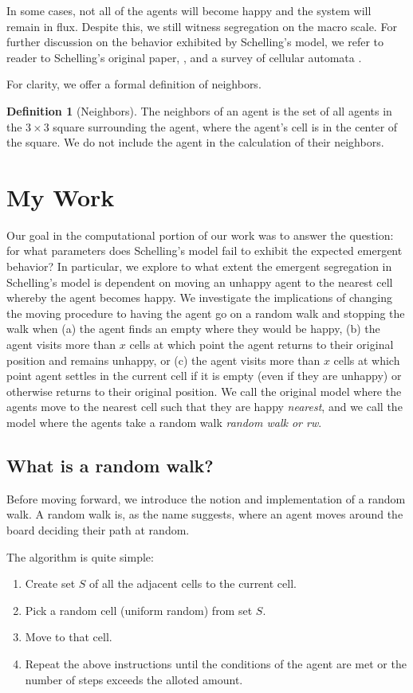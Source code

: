 \documentclass[11pt,twoside]{amsart}
\theoremstyle{theorem}
\theoremstyle{definition}
\newtheorem{definition}[theorem]{Definition}
\theoremstyle{remark}
\begin{document}
In some cases, not all of the agents will become happy and the system will remain in flux. 
Despite this, we still witness segregation on the macro scale. 
For further discussion on the behavior exhibited by Schelling's model, we refer to reader to Schelling's original paper, \cite{schelling}, and a survey of cellular automata \cite{thesis}.

For clarity, we offer a formal definition of neighbors.
\begin{definition}[Neighbors]
    The neighbors of an agent is the set of all agents in the $3 \times 3$ square surrounding the agent, where the agent's cell is in the center of the square. 
    We do not include the agent in the calculation of their neighbors. 
\end{definition}

\section{My Work}
Our goal in the computational portion of our work was to answer the question: for what parameters does Schelling's model fail to exhibit the expected emergent behavior?
In particular, we explore to what extent the emergent segregation in Schelling's model is dependent on moving an unhappy agent to the nearest cell whereby the agent becomes happy.
We investigate the implications of changing the moving procedure to having the agent go on a random walk and stopping the walk when (a) the agent finds an empty where they would be happy, (b) the agent visits more than $x$ cells at which point the agent returns to their original position and remains unhappy, or (c) the agent visits more than $x$ cells at which point agent settles in the current cell if it is empty (even if they are unhappy) or otherwise returns to their original position.
We call the original model where the agents move to the nearest cell such that they are happy \emph{nearest}, and we call the model where the agents take a random walk \emph{random walk or rw}.

\subsection{What is a random walk?}
Before moving forward, we introduce the notion and implementation of a random walk.
A random walk is, as the name suggests, where an agent moves around the board deciding their path at random. 

The algorithm is quite simple:
\begin{enumerate}
    \item Create set $S$ of all the adjacent cells to the current cell.
    \item Pick a random cell (uniform random) from set $S$.
    \item Move to that cell. 
    \item Repeat the above instructions until the conditions of the agent are met or the number of steps exceeds the alloted amount.
\end{enumerate}
\end{document}
